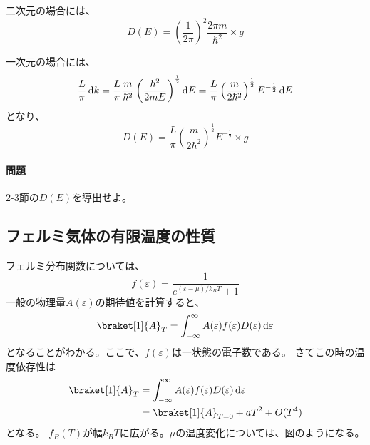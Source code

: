 \documentclass[titlepage]{ltjsarticle}
\newcommand{\ev}[1]{\braket[1]{#1}}
\begin{document}
二次元の場合には、
\begin{equation}
  D(E) = \left( \frac{1}{2\pi} \right)^2 \frac{2\pi m}{\hbar^2} \times g 
\end{equation}

一次元の場合には、
\begin{equation}
  \frac{L}{\pi} \odif{k} = \frac{L}{\pi} \frac{m}{\hbar^2} \left( \frac{\hbar^2}{2mE} \right)^{\frac{1}{2}} \odif{E} = \frac{L}{\pi} \left( \frac{m}{2 \hbar^2} \right)^{\frac{1}{2}}E^{-\frac{1}{2}} \odif{E}
\end{equation}
となり、
\begin{equation}
  D(E) = \frac{L}{\pi} \left( \frac{m}{2\hbar^2} \right)^{\frac{1}{2}} E^{-\frac{1}{2}} \times g
\end{equation}

\paragraph{問題}
2-3節の\(D(E)\)を導出せよ。


\subsection{フェルミ気体の有限温度の性質}
フェルミ分布関数については、
\begin{equation}
  f(\varepsilon) = \frac{1}{e^{(\varepsilon-\mu)/k_BT}+1}
\end{equation}
一般の物理量\(A(\varepsilon)\)の期待値を計算すると、
\begin{equation}
  \ev{A}_T = \int_{-\infty}^{\infty} A(\varepsilon)f(\varepsilon)D(\varepsilon) \odif{\varepsilon}
\end{equation}
となることがわかる。ここで、\(f(\varepsilon)\)は一状態の電子数である。
さてこの時の温度依存性は
\begin{align}
  \ev{A}_T & = \int_{-\infty}^{\infty} A(\varepsilon)f(\varepsilon)D(\varepsilon) \odif{\varepsilon}\\
  & = \ev{{A}}_{T = 0} + a T^2 + O(T^4)
\end{align}
となる。
\(f_B(T)\)が幅\(k_BT\)に広がる。\(\mu\)の温度変化については、図のようになる。


\end{document}
